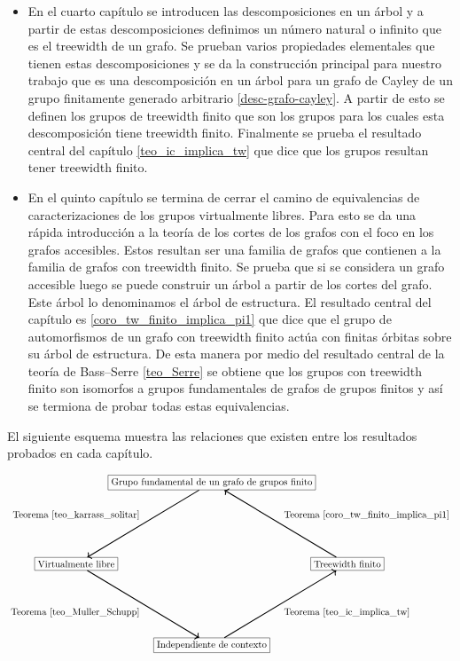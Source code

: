 \documentclass[tesis.tex]{subfiles}
\begin{document}
\begin{itemize}
			
		
		\item 
			En el cuarto capítulo se introducen las descomposiciones en un árbol y a partir de estas descomposiciones definimos un número natural o infinito que es el treewidth de un grafo.
			Se prueban varios propiedades elementales que tienen estas descomposiciones y se da la construcción principal para nuestro trabajo que es una descomposición en un árbol para un grafo de Cayley de un grupo finitamente generado arbitrario \ref*{desc-grafo-cayley}.
			A partir de esto se definen los grupos de treewidth finito que son los grupos para los cuales esta descomposición tiene treewidth finito.
			Finalmente se prueba el resultado central del capítulo \ref{teo_ic_implica_tw} que dice que los grupos \ic resultan tener treewidth finito.
			
		\item 
			En el quinto capítulo se termina de cerrar el camino de equivalencias de caracterizaciones de los grupos virtualmente libres.
			Para esto se da una rápida introducción a la teoría de los cortes de los grafos con el foco en los grafos accesibles.  
			Estos resultan ser una familia de grafos que contienen a la familia de grafos con treewidth finito.
			Se prueba que si se considera un grafo accesible luego se puede construir un árbol a partir de los cortes del grafo.
			Este árbol lo denominamos el árbol de estructura.
			El resultado central del capítulo es \ref{coro_tw_finito_implica_pi1} que dice que el grupo de automorfismos de un grafo con treewidth finito actúa con finitas órbitas sobre su árbol de estructura. 
			De esta manera por medio del resultado central de la teoría de Bass--Serre  \ref{teo_Serre} se obtiene que los grupos con treewidth finito son isomorfos a grupos fundamentales de grafos de grupos finitos y así se termiona de probar todas estas equivalencias.
	\end{itemize}
		
	
	
	
	El siguiente esquema muestra las relaciones que existen entre los resultados probados en cada capítulo.
	
	\[	
	\begin{tikzpicture}
		\path 
		(0,0) node(a) [rectangle,draw] {Grupo fundamental de un grafo de grupos finito}
		(5,-3) node(b) [rectangle,draw] {Treewidth finito}
		(0,-6) node(c) [rectangle,draw] {Independiente de contexto}
		(-5,-3) node (d) [rectangle,draw] {Virtualmente libre};
		\draw   
		(d) edge[<-,line width=1.0pt,"Teorema \ref{teo_karrass_solitar}"] (a) 
		(c) edge[<-,line width=1.0pt,"Teorema \ref{teo_Muller_Schupp}"] (d)
		(b) edge[<-,line width=1.0pt,"Teorema \ref{teo_ic_implica_tw}"] (c)
		(a)  edge[<-,line width=1.0pt,"Teorema \ref{coro_tw_finito_implica_pi1}"] (b);
	\end{tikzpicture}
	\]
	
	
	
	
	
	
	
\end{document}
